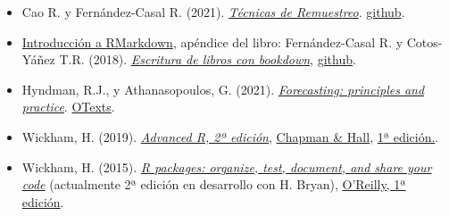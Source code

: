 \documentclass[
  spanish,
  10pt,
]{book}
\theoremstyle{break}
\theoremstyle{nonumberplain}
\begin{document}
\begin{itemize}
\item
  Cao R. y Fernández-Casal R. (2021). \emph{\href{https://rubenfcasal.github.io/book_remuestreo}{Técnicas de Remuestreo}}. \href{https://github.com/rubenfcasal/book_remuestreo}{github}.
\item
  \href{https://rubenfcasal.github.io/bookdown_intro/rmarkdown.html}{Introducción a RMarkdown}, apéndice del libro: Fernández-Casal R. y Cotos-Yáñez T.R. (2018). \emph{\href{https://rubenfcasal.github.io/bookdown_intro}{Escritura de libros con bookdown}}, \href{https://github.com/rubenfcasal/bookdown_intro}{github}.
\item
  Hyndman, R.J., y Athanasopoulos, G. (2021). \emph{\href{https://otexts.com/fpp3}{Forecasting: principles and practice}}. \href{https://www.amazon.es/dp/0987507133}{OTexts}.
\item
  Wickham, H. (2019). \emph{\href{https://adv-r.hadley.nz/}{Advanced R, 2ª edición}}, \href{https://www.amazon.com/dp/0815384572}{Chapman \& Hall}, \href{http://adv-r.had.co.nz/}{1ª edición.}.
\item
  Wickham, H. (2015). \emph{\href{http://r-pkgs.had.co.nz/}{R packages: organize, test, document, and share your code}} (actualmente 2ª edición en desarrollo con H. Bryan), \href{http://shop.oreilly.com/product/0636920034421.do}{O'Reilly, 1ª edición}.
\end{itemize}

\nocite{hull1962, vonneuman1951, marsaglia1977}

\end{document}
